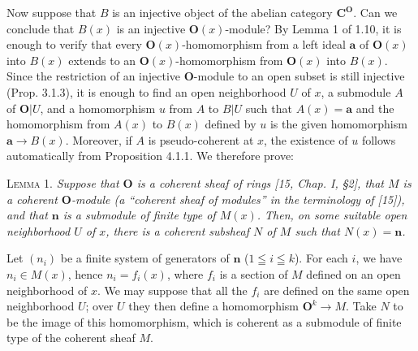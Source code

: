 Now suppose that $B$ is an injective object of the abelian category $\mathbf C^{\mathbf O}$.
Can we conclude that $B(x)$ is an injective ${\mathbf O}(x)$-module? By Lemma 1 of 1.10,
it is enough to verify that every ${\mathbf O}(x)$-homomorphism from a left ideal $\mathbf a$ of
${\mathbf O}(x)$ into $B(x)$ extends to an ${\mathbf O}(x)$-homomorphism from ${\mathbf O}(x)$ into $B(x)$.
Since the restriction of an injective ${\mathbf O}$-module to an open subset is still
injective (Prop. 3.1.3), it is enough to find an open neighborhood $U$ of $x$,
a submodule $A$ of ${\mathbf O}|U$, and a homomorphism $u$ from $A$ to $B|U$ such that
$A(x)=\mathbf a$ and the homomorphism from $A(x)$ to $B(x)$ defined by $u$ is the
given homomorphism $\mathbf a\to B(x)$. Moreover, if $A$ is
pseudo-coherent at $x$, the existence of $u$ follows automatically from
Proposition 4.1.1. We therefore prove:

\textsc{Lemma 1.} \textit{Suppose that ${\mathbf O}$ is a coherent sheaf of
rings \textup{[15, Chap. I, §2]}, that $M$ is a coherent ${\mathbf O}$-module \textup{(}a ``coherent sheaf
of modules'' in the terminology of \textup{[15])}, and that $\mathbf n$ is a submodule of
finite type of $M(x)$. Then, on some suitable open neighborhood $U$ of $x$,
there is a coherent subsheaf $N$ of $M$ such that $N(x)=\mathbf n$.}

Let $(n_i)$ be a finite system of generators of $\mathbf n$ ($1\leqq i\leqq k$). For
each $i$, we have $n_i\in M(x)$, hence $n_i=f_i(x)$, where $f_i$ is a section
of $M$ defined on an open neighborhood of $x$. We may suppose that all the
$f_i$ are defined on the same open neighborhood $U$; over $U$ they then
define a homomorphism ${\mathbf O}^k\to M$. Take $N$ to be the image of
this homomorphism, which is coherent as a submodule of finite type of the
coherent sheaf $M$.

